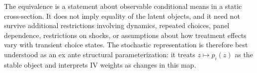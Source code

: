\documentclass[11pt]{article}
\newcommand{\1}{\mathbf{1}}
\begin{document}
The equivalence is a statement about observable conditional  means in a static cross-section. It does not imply equality of the latent objects, and it need not survive additional restrictions involving dynamics, repeated choices, panel dependence, restrictions on shocks, or assumptions about how treatment effects vary with transient choice states. The stochastic representation is therefore best understood as an ex ante structural parameterization: it treats $z\mapsto p_i(z)$ as the stable object and interprets IV weights as changes in this map.
\newpage


\end{document}
